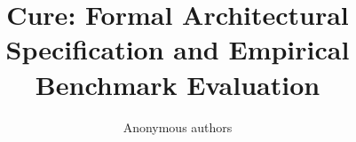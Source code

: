 \title{\textbf{Cure: Formal Architectural Specification and Empirical Benchmark Evaluation}}

\author{Anonymous authors}
